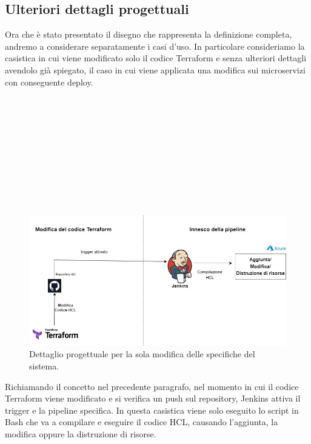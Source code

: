 \documentclass[a4paper,12pt]{report}
\begin{document}
\subsection{Ulteriori dettagli progettuali}
Ora che è stato presentato il disegno che rappresenta la definizione completa, andremo a considerare separatamente i casi d'uso. In particolare consideriamo la casistica in cui viene modificato solo il codice Terraform e senza ulteriori dettagli avendolo già spiegato, il caso in cui viene applicata una modifica sui microservizi con conseguente deploy. \\ \\ \\ \\ \\ \\ \\ \\ \\ \\ \\

\begin{figure}[h]
	\includegraphics[width=1.0\textwidth]{modifica_terraform}
    \caption{Dettaglio progettuale per la sola modifica delle specifiche del sistema.}
    \label{fig:modifica_terraform}
\end{figure} 

Richiamando il concetto nel precedente paragrafo, nel momento in cui il codice Terraform viene modificato e si verifica un push sul repository, Jenkins attiva il trigger e la pipeline specifica. In questa casistica viene solo eseguito lo script in Bash che va a compilare e eseguire il codice HCL, causando l'aggiunta, la modifica oppure la distruzione di risorse.\\ \\ \\ \\ \\ \\ \\ \\ \\ \\ \\ \\ \\
\end{document}
